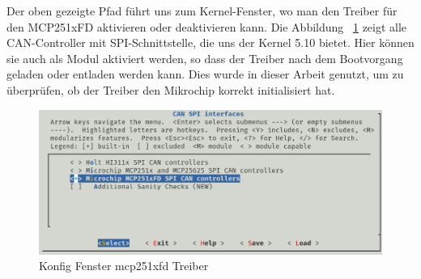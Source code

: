 Der oben gezeigte Pfad führt uns zum Kernel-Fenster, wo man den Treiber für den MCP251xFD aktivieren oder deaktivieren kann. Die Abbildung ~\ref{fig:mcp:treiber} zeigt alle CAN-Controller mit SPI-Schnittstelle, die uns der Kernel 5.10 bietet. Hier können sie auch als Modul aktiviert werden, so dass der Treiber nach dem Bootvorgang geladen oder entladen werden kann. Dies wurde in dieser Arbeit genutzt, um zu überprüfen, ob der Treiber den Mikrochip korrekt initialisiert hat.

\begin{figure}[H]
	\begin{center}		\includegraphics[width=1\textwidth]{./images/mcp_treiber.jpg}
	\end{center}
	\vspace{-5pt}
	\caption[Konfig Fenster mcp251xfd Treiber]{Konfig Fenster mcp251xfd Treiber} %
	\label{fig:mcp:treiber}
	\vspace{-5pt}
\end{figure}

